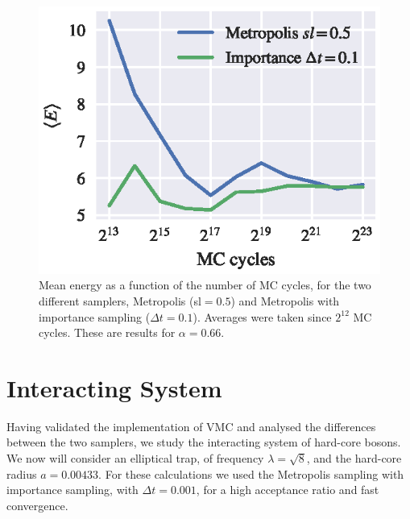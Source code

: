 \documentclass[aps,reprint,superscriptaddress,nofootinbib]{revtex4-2}
\begin{document}
    \begin{figure}
        \centering
        \includegraphics{figures/part_c/E_vs_mc_cycles_comp.eps}
        \caption{Mean energy as a function of the number of MC cycles, for the two different samplers, Metropolis (sl\(=0.5\)) and Metropolis with importance sampling (\(\Delta t = 0.1\)). Averages were taken since \(2^{12}\) MC cycles. These are results for \(\alpha = 0.66\).}
        \label{fig:E_vs_mc_cycles_comp}
    \end{figure}
    

\section*{Interacting System}

    Having validated the implementation of VMC and analysed the differences between the two samplers, we study the interacting system of hard-core bosons. We now will consider an elliptical trap, of frequency \(\lambda = \sqrt{8}\), and the hard-core radius \(a = 0.00433\). For these calculations we used the Metropolis sampling with importance sampling, with \(\Delta t = 0.001\), for a high acceptance ratio and fast convergence.
    
\end{document}
